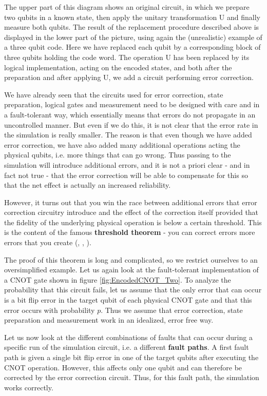 \documentclass[a4paper, draft]{article}
\theoremstyle{own}
\theoremstyle{remark}
\begin{document}
The upper part of this diagram shows an original circuit, in which we prepare two qubits in a known state, then apply the unitary transformation U and finally measure both qubits. The result of the replacement procedure described above is displayed in the lower part of the picture, using again the (unrealistic) example of a three qubit code. Here we have replaced each qubit by a corresponding block of three qubits holding the code word. The operation U has been replaced by its logical implementation, acting on the encoded states, and both after the preparation and after applying U, we add a circuit performing error correction.

We have already seen that the circuits used for error correction, state preparation, logical gates and measurement need to be designed with care and in a fault-tolerant way, which essentially means that errors do not propagate in an uncontrolled manner. But even if we do this, it is not clear that the error rate in the simulation is really smaller. The reason is that even though we have added error correction, we have also added many additional operations acting the physical qubits, i.e. more things that can go wrong. Thus passing to the simulation will introduce additional errors, and it is not a priori clear - and in fact not true - that the error correction will be able to compensate for this so that the net effect is actually an increased reliability. 

However, it turns out that you win the race between additional errors that error correction circuitry introduce and the effect of the correction itself provided that the fidelity of the underlying physical operation is below a certain threshold. This is the content of the famous {\bf threshold theorem} - you can correct errors more errors that you create (\cite{AharonovOr}, \cite{KnillLaflammeZurek}, \cite{AliferisGottesmanPreskill}).

The proof of this theorem is long and complicated, so we restrict ourselves to an oversimplified example. Let us again look at the fault-tolerant implementation of a CNOT gate shown in figure \ref{fig:EncodedCNOT_Two}. To analyze the probability that this circuit fails, let us assume that the only error that can occur is a bit flip error in the target qubit of each physical CNOT gate and that this error occurs with probability $p$. Thus we assume that error correction, state preparation and measurement work in an idealized, error free way.

Let us now look at the different combinations of faults that can occur during a specific run of the simulation circuit, i.e. a different {\bf fault paths}. A first fault path is given a single bit flip error in one of the target qubits after executing the CNOT operation. However, this affects only one qubit and can therefore be corrected by the error correction circuit. Thus, for this fault path, the simulation works correctly.
\end{document}
